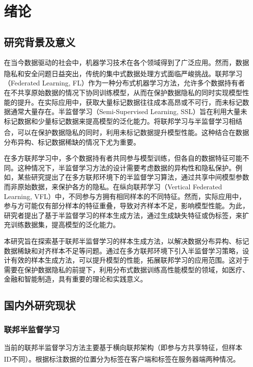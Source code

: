

\chapter{绪论} %
\thispagestyle{others} %
\pagestyle{others} %
\xiaosi %


\section{研究背景及意义}
在当今数据驱动的社会中，机器学习技术在各个领域得到了广泛应用。然而，数据隐私和安全问题日益突出，传统的集中式数据处理方式面临严峻挑战\textsuperscript{\cite{chen2021secureboost+,de2010practical}}。联邦学习（Federated Learning, FL）作为一种分布式机器学习方法，允许多个数据持有者在不共享原始数据的情况下协同训练模型，从而在保护数据隐私的同时实现模型性能的提升。在实际应用中，获取大量标记数据往往成本高昂或不可行，而未标记数据通常大量存在。半监督学习（Semi-Supervised Learning, SSL）旨在利用大量未标记数据和少量标记数据来提高模型的泛化能力。将联邦学习与半监督学习相结合，可以在保护数据隐私的同时，利用未标记数据提升模型性能\textsuperscript{\cite{li2021comatch}}。这种结合在数据分布异构、标记数据稀缺的情况下尤为重要。

在多方联邦学习中，多个数据持有者共同参与模型训练，但各自的数据特征可能不同。这种情况下，半监督学习方法的设计需要考虑数据的异构性和隐私保护。例如，某些研究提出了在多方联邦环境下的半监督学习算法，通过共享中间模型参数而非原始数据，来保护各方的隐私。在纵向联邦学习（Vertical Federated Learning, VFL）中，不同参与方拥有相同样本的不同特征。然而，实际应用中，参与方可能仅有部分样本的特征重叠，导致对齐样本不足，影响模型性能。为此，研究者提出了基于半监督学习的样本生成方法，通过生成缺失特征或伪标签，来扩充训练数据集，提高模型的泛化能力。

本研究旨在探索基于联邦半监督学习的样本生成方法，以解决数据分布异构、标记数据稀缺和对齐样本不足等问题。通过在多方联邦环境下引入半监督学习策略，设计有效的样本生成方法，可以提升模型的性能，拓展联邦学习的应用范围。这对于需要在保护数据隐私的前提下，利用分布式数据训练高性能模型的领域，如医疗、金融和智能制造，具有重要的理论和实践意义。
\section{国内外研究现状}
\subsection{联邦半监督学习}
当前的联邦半监督学习方法主要基于横向联邦架构（即参与方共享特征，但样本ID不同）。根据标注数据的位置分为标签在客户端和标签在服务器端两种情况\textsuperscript{\cite{jin2023federated}}。

